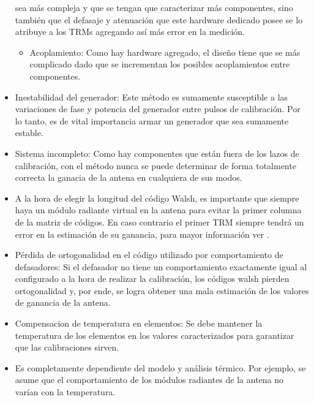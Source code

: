 \begin{itemize}
		sea más compleja y que se tengan que caracterizar más componentes, sino también que el defasaje y atenuación que este
		hardware dedicado posee se lo atribuye a los TRMs agregando así más error en la medición.
	\begin{itemize}
		\item Acoplamiento: Como hay hardware agregado, el diseño tiene que se más complicado dado que se incrementan los posibles
			acoplamientos entre componentes.
	\end{itemize}
	\item Inestabilidad del generador: Este método es sumamente susceptible a las variaciones de fase y potencia del generador
		entre pulsos de calibración. Por lo tanto, es de vital importancia armar un generador que sea sumamente estable.
	\item Sistema incompleto: Como hay componentes que están fuera de los lazos de calibración, con el método nunca se puede
		determinar de forma totalmente correcta la ganacia de la antena en cualquiera de sus modos.
	\item A la hora de elegir la longitud del código Walsh, es importante que siempre haya un módulo radiante virtual en la
		antena para evitar la primer columna de la matriz de códigos. En caso contrario el primer TRM siempre tendrá un error en
		la estimación de su ganancia, para mayor información ver \cite{Wang2010}.
	\item Pérdida de ortogonalidad en el código utilizado por comportamiento de defasadores: Si el defasador no tiene un
		comportamiento exactamente igual al configurado a la hora de realizar la calibración, los códigos walsh pierden
		ortogonalidad y, por ende, se logra obtener una mala estimación de los valores de ganancia de la antena.
    \item Compensacion de temperatura en elementos: Se debe mantener la temperatura de los elementos en los valores
        caracterizados para garantizar que las calibraciones sirven.
    \item Es completamente dependiente del modelo y análisis térmico. Por ejemplo, se asume que el comportamiento de los
        módulos radiantes de la antena no varían con la temperatura.
\end{itemize}
